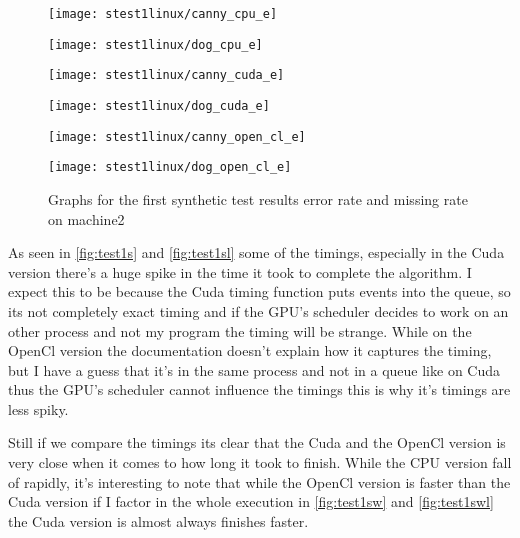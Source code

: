 \begin{figure}[H]
\centering
\begin{minipage}[t]{.49\textwidth}
\centering
\texttt{[image: stest1linux/canny\_cpu\_e]}
\end{minipage}
\begin{minipage}[t]{.49\textwidth}
\centering
\texttt{[image: stest1linux/dog\_cpu\_e]}
\end{minipage}
\begin{minipage}[t]{.49\textwidth}
\centering
\texttt{[image: stest1linux/canny\_cuda\_e]}
\end{minipage}
\begin{minipage}[t]{.49\textwidth}
\centering
\texttt{[image: stest1linux/dog\_cuda\_e]}
\end{minipage}
\begin{minipage}[t]{.49\textwidth}
\centering
\texttt{[image: stest1linux/canny\_open\_cl\_e]}
\end{minipage}
\begin{minipage}[t]{.49\textwidth}
\centering
\texttt{[image: stest1linux/dog\_open\_cl\_e]}
\end{minipage}
\caption{Graphs for the first synthetic test results error rate and missing rate on machine2}
\label{fig:test1sel}
\end{figure}

As seen in \autoref{fig:test1s} and \autoref{fig:test1sl} some of the timings, especially in the Cuda version there's a huge spike in the time it took to complete the algorithm. I expect this to be because the Cuda timing function puts events into the queue, so its not completely exact timing and if the \ac{GPU}'s scheduler decides to work on an other process and not my program the timing will be strange. While on the OpenCl version the documentation doesn't explain how it captures the timing, but I have a guess that it's in the same process and not in a queue like on Cuda thus the \ac{GPU}'s scheduler cannot influence the timings this is why it's timings are less spiky. 

Still if we compare the timings its clear that the Cuda and the OpenCl version is very close when it comes to how long it took to finish. While the \ac{CPU} version fall of rapidly, it's interesting to note that while the OpenCl version is faster than the Cuda version if I factor in the whole execution in \autoref{fig:test1sw} and \autoref{fig:test1swl} the Cuda version is almost always finishes faster.

